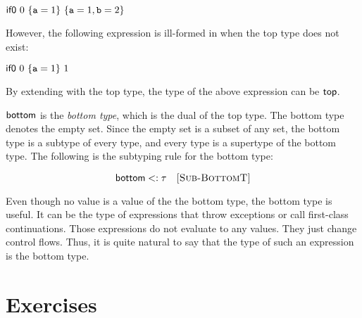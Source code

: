 $\textsf{if0}\ 0\ \{\texttt{a}=1\}\ \{\texttt{a}=1,\texttt{b}=2\}$

However, the following expression is ill-formed in \lang when the top type does
not exist:

$\textsf{if0}\ 0\ \{\texttt{a}=1\}\ 1$

By extending \lang with the top type, the type of the above expression can be
$\textsf{top}$.

$\textsf{bottom}$ is the \textit{bottom type}, which is the dual of
the top type. The bottom type denotes the empty set. Since the empty set is a subset of
any set, the bottom type is a subtype of every type, and
every type is a supertype of the bottom type. The following is the subtyping rule
for the bottom type:


\[
  \textsf{bottom}<:\tau
  \quad\textsc{[Sub-BottomT]}
\]

Even though no value is a value of the the bottom type,
the bottom type is useful. It can be the type of
expressions that throw exceptions or call first-class continuations. Those
expressions do not evaluate to any values. They just change control flows.
Thus, it is quite natural to say that the type of such an expression
is the bottom type.

\section{Exercises}

